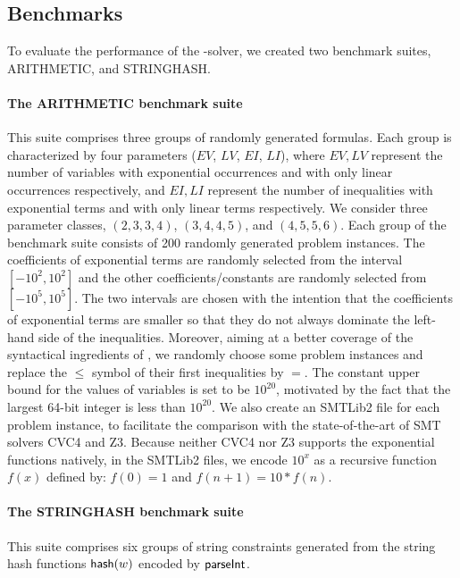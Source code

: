 \subsection{Benchmarks}

To evaluate the performance of the {\paexp}-solver, we created two benchmark suites, ARITHMETIC, and STRINGHASH.

\paragraph{The ARITHMETIC benchmark suite} 
This suite comprises three groups of randomly generated {\paexp} formulas. Each group is characterized by four parameters ($EV$, $LV$, $EI$, $LI$), where $EV, LV$ represent the number of variables with exponential occurrences and with only linear occurrences respectively, and $EI, LI$ represent the number of inequalities with exponential terms and with only linear terms respectively. 
We consider three parameter classes, $(2, 3, 3, 4)$, $(3, 4, 4, 5)$, and $(4, 5, 5, 6)$. 
Each group of the benchmark suite consists of 200 randomly generated problem instances. The coefficients of exponential terms are randomly selected from the interval $[-10^2, 10^2]$ and the other coefficients/constants are randomly selected from $[-10^5, 10^5]$. The two intervals are chosen with the intention that the coefficients of exponential terms are smaller so that they do not always dominate the left-hand side of the inequalities. Moreover, aiming at a better coverage of the syntactical ingredients of {\paexp}, we randomly choose some problem instances and replace the $\le$ symbol of their first inequalities by $=$. The constant upper bound for the values of variables is set to be $10^{20}$, motivated by the fact that the largest 64-bit integer is less than $10^{20}$. We also create an SMTLib2 file for each problem instance, to facilitate the comparison with the state-of-the-art of SMT solvers CVC4 and Z3. Because neither CVC4 nor Z3 supports the exponential functions natively, in the SMTLib2 files, we encode $10^x$ as a recursive function $f(x)$ defined by: $f(0) = 1$ and $f(n+1) = 10*f(n)$.

%

\paragraph{The STRINGHASH benchmark suite} 
This suite comprises six groups of string constraints generated from the string hash functions ${\sf hash}(w)$ encoded by $\textsf{parseInt}$.

